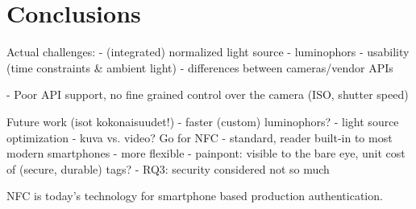 \documentclass[thesis.tex]{subfiles}
\begin{document}
\chapter{Conclusions}
\label{chapter:conclusions}

Actual challenges:
- (integrated) normalized light source
- luminophors
- usability (time constraints \& ambient light)
- differences between cameras/vendor APIs

- Poor API support, no fine grained control over the camera (ISO, shutter speed)

Future work (isot kokonaisuudet!)
  - faster (custom) luminophors?
  - light source optimization
  - kuva vs. video?
Go for NFC
- standard, reader built-in to most modern smartphones
- more flexible
- painpont: visible to the bare eye, unit cost of (secure, durable) tags?
- RQ3: security considered not so much

NFC is today's technology for smartphone based production authentication.
\end{document}
